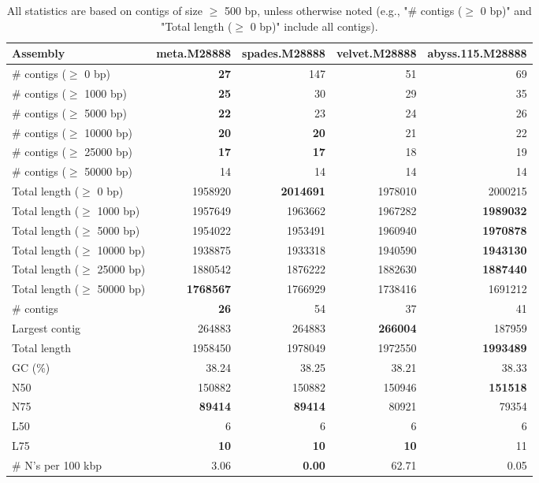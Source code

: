 \documentclass[12pt,a4paper]{article}
\begin{document}
\begin{table}[ht]
\begin{center}
\caption{All statistics are based on contigs of size $\geq$ 500 bp, unless otherwise noted (e.g., "\# contigs ($\geq$ 0 bp)" and "Total length ($\geq$ 0 bp)" include all contigs).}
\begin{tabular}{|l*{4}{|r}|}
\hline
Assembly & meta.M28888 & spades.M28888 & velvet.M28888 & abyss.115.M28888 \\ \hline
\# contigs ($\geq$ 0 bp) & {\bf 27} & 147 & 51 & 69 \\ \hline
\# contigs ($\geq$ 1000 bp) & {\bf 25} & 30 & 29 & 35 \\ \hline
\# contigs ($\geq$ 5000 bp) & {\bf 22} & 23 & 24 & 26 \\ \hline
\# contigs ($\geq$ 10000 bp) & {\bf 20} & {\bf 20} & 21 & 22 \\ \hline
\# contigs ($\geq$ 25000 bp) & {\bf 17} & {\bf 17} & 18 & 19 \\ \hline
\# contigs ($\geq$ 50000 bp) & 14 & 14 & 14 & 14 \\ \hline
Total length ($\geq$ 0 bp) & 1958920 & {\bf 2014691} & 1978010 & 2000215 \\ \hline
Total length ($\geq$ 1000 bp) & 1957649 & 1963662 & 1967282 & {\bf 1989032} \\ \hline
Total length ($\geq$ 5000 bp) & 1954022 & 1953491 & 1960940 & {\bf 1970878} \\ \hline
Total length ($\geq$ 10000 bp) & 1938875 & 1933318 & 1940590 & {\bf 1943130} \\ \hline
Total length ($\geq$ 25000 bp) & 1880542 & 1876222 & 1882630 & {\bf 1887440} \\ \hline
Total length ($\geq$ 50000 bp) & {\bf 1768567} & 1766929 & 1738416 & 1691212 \\ \hline
\# contigs & {\bf 26} & 54 & 37 & 41 \\ \hline
Largest contig & 264883 & 264883 & {\bf 266004} & 187959 \\ \hline
Total length & 1958450 & 1978049 & 1972550 & {\bf 1993489} \\ \hline
GC (\%) & 38.24 & 38.25 & 38.21 & 38.33 \\ \hline
N50 & 150882 & 150882 & 150946 & {\bf 151518} \\ \hline
N75 & {\bf 89414} & {\bf 89414} & 80921 & 79354 \\ \hline
L50 & 6 & 6 & 6 & 6 \\ \hline
L75 & {\bf 10} & {\bf 10} & {\bf 10} & 11 \\ \hline
\# N's per 100 kbp & 3.06 & {\bf 0.00} & 62.71 & 0.05 \\ \hline
\end{tabular}
\end{center}
\end{table}
\end{document}
